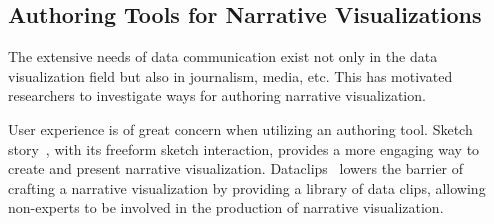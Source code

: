 %
%

\subsection{Authoring Tools for Narrative Visualizations}
The extensive needs of data communication exist not only in the data visualization field but also in journalism, media, etc. This has motivated researchers to investigate ways for authoring narrative visualization. 

User experience is of great concern when utilizing an authoring tool. Sketch story~\cite{lee_sketchstory:_2013}, with its freeform sketch interaction, provides a more engaging way to create and present narrative visualization. Dataclips~\cite{amini_authoring_2017} lowers the barrier of crafting a narrative visualization by providing a library of data clips, allowing non-experts to be involved in the production of narrative visualization. 

